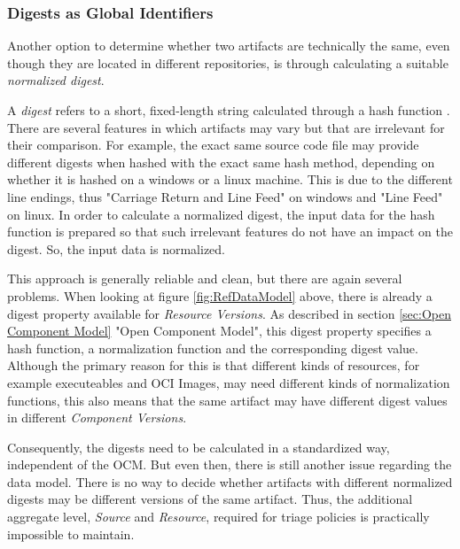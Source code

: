 \subsubsection{Digests as Global Identifiers} 
Another option to determine whether two artifacts are technically the same, even though they are located in different repositories, is through calculating a suitable \emph{normalized digest}.\par %
A \emph{digest} refers to a short, fixed-length string calculated through a hash function \cite{Cryptography}. There are several features in which artifacts may vary but that are irrelevant for their comparison. For example, the exact same source code file may provide different digests when hashed with the exact same hash method, depending on whether it is hashed on a windows or a linux machine. This is due to the different line endings, thus "Carriage Return and Line Feed" on windows and "Line Feed" on linux. In order to calculate a normalized digest, the input data for the hash function is prepared so that such irrelevant features do not have an impact on the digest. So, the input data is normalized.\par
This approach is generally reliable and clean, but there are again several problems. When looking at figure \ref{fig:RefDataModel} above, there is already a digest property available for \emph{Resource Versions}. As described in section \ref{sec:Open Component Model} "Open Component Model", this digest property specifies a hash function, a normalization function and the corresponding digest value. Although the primary reason for this is that different kinds of resources, for example executeables and OCI Images, may need different kinds of normalization functions, this also means that the same artifact may have different digest values in different \emph{Component Versions}.\par
Consequently, the digests need to be calculated in a standardized way, independent of the OCM. But even then, there is still another issue regarding the data model. There is no way to decide whether artifacts with different normalized digests may be different versions of the same artifact. Thus, the additional aggregate level, \emph{Source} and \emph{Resource}, required for triage policies is practically impossible to maintain.

